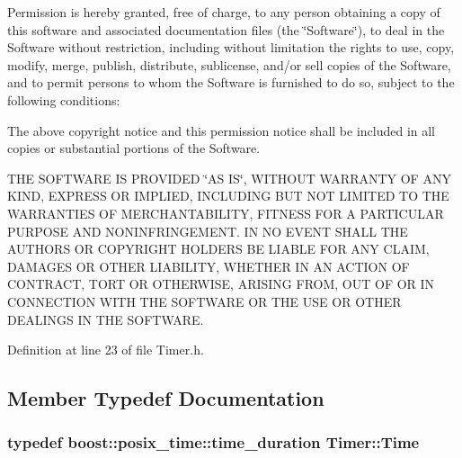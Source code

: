 Permission is hereby granted, free of charge, to any person obtaining a copy of this software and associated documentation files (the \char`\"{}\+Software\char`\"{}), to deal in the Software without restriction, including without limitation the rights to use, copy, modify, merge, publish, distribute, sublicense, and/or sell copies of the Software, and to permit persons to whom the Software is furnished to do so, subject to the following conditions\+:

The above copyright notice and this permission notice shall be included in all copies or substantial portions of the Software.

T\+H\+E S\+O\+F\+T\+W\+A\+R\+E I\+S P\+R\+O\+V\+I\+D\+E\+D \char`\"{}\+A\+S I\+S\char`\"{}, W\+I\+T\+H\+O\+U\+T W\+A\+R\+R\+A\+N\+T\+Y O\+F A\+N\+Y K\+I\+N\+D, E\+X\+P\+R\+E\+S\+S O\+R I\+M\+P\+L\+I\+E\+D, I\+N\+C\+L\+U\+D\+I\+N\+G B\+U\+T N\+O\+T L\+I\+M\+I\+T\+E\+D T\+O T\+H\+E W\+A\+R\+R\+A\+N\+T\+I\+E\+S O\+F M\+E\+R\+C\+H\+A\+N\+T\+A\+B\+I\+L\+I\+T\+Y, F\+I\+T\+N\+E\+S\+S F\+O\+R A P\+A\+R\+T\+I\+C\+U\+L\+A\+R P\+U\+R\+P\+O\+S\+E A\+N\+D N\+O\+N\+I\+N\+F\+R\+I\+N\+G\+E\+M\+E\+N\+T. I\+N N\+O E\+V\+E\+N\+T S\+H\+A\+L\+L T\+H\+E A\+U\+T\+H\+O\+R\+S O\+R C\+O\+P\+Y\+R\+I\+G\+H\+T H\+O\+L\+D\+E\+R\+S B\+E L\+I\+A\+B\+L\+E F\+O\+R A\+N\+Y C\+L\+A\+I\+M, D\+A\+M\+A\+G\+E\+S O\+R O\+T\+H\+E\+R L\+I\+A\+B\+I\+L\+I\+T\+Y, W\+H\+E\+T\+H\+E\+R I\+N A\+N A\+C\+T\+I\+O\+N O\+F C\+O\+N\+T\+R\+A\+C\+T, T\+O\+R\+T O\+R O\+T\+H\+E\+R\+W\+I\+S\+E, A\+R\+I\+S\+I\+N\+G F\+R\+O\+M, O\+U\+T O\+F O\+R I\+N C\+O\+N\+N\+E\+C\+T\+I\+O\+N W\+I\+T\+H T\+H\+E S\+O\+F\+T\+W\+A\+R\+E O\+R T\+H\+E U\+S\+E O\+R O\+T\+H\+E\+R D\+E\+A\+L\+I\+N\+G\+S I\+N T\+H\+E S\+O\+F\+T\+W\+A\+R\+E. 

Definition at line 23 of file Timer.\+h.



\subsection{Member Typedef Documentation}
\hypertarget{class_timer_ad4fe4f911b3f67a6304b506f36acd97c}{
\subsubsection[{Time}]{\setlength{\rightskip}{0pt plus 5cm}typedef boost\+::posix\+\_\+time\+::time\+\_\+duration {\bf Timer\+::\+Time}}}\label{class_timer_ad4fe4f911b3f67a6304b506f36acd97c}


